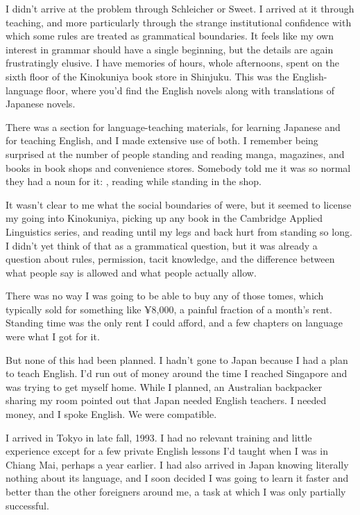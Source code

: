 I didn't arrive at the problem through Schleicher or Sweet. I arrived
at it through teaching, and more particularly through the strange
institutional confidence with which some rules are treated as grammatical
boundaries. It feels like my own interest in grammar should have a single
beginning, but the details are again frustratingly elusive. I have
memories of hours, whole afternoons, spent on the sixth floor of the
Kinokuniya book store in Shinjuku. This was the English-language floor,
where you'd find the English novels along with translations of Japanese
novels.

There was a section for language-teaching materials, for learning
Japanese and for teaching English, and I made extensive use of both. I
remember being surprised at the number of people standing and reading
manga, magazines, and books in book shops and convenience stores.
Somebody told me it was so normal they had a noun for it:
, reading while standing in the shop.

It wasn't clear to me what the social boundaries of 
were, but it seemed to license my going into Kinokuniya, picking up any
book in the Cambridge Applied Linguistics series, and reading until my
legs and back hurt from standing so long. I didn't yet think of that as
a grammatical question, but it was already a question about rules,
permission, tacit knowledge, and the difference between what people say
is allowed and what people actually allow.

There was no way I was going to be able to buy any of those tomes, which
typically sold for something like ¥8,000, a painful fraction of a
month's rent. Standing time was the only rent I could afford, and a few
chapters on language were what I got for it.

But none of this had been planned. I hadn't gone to Japan because I had a plan to teach English. I'd run out of money around the time I reached Singapore and was trying to get myself home. While I planned, an Australian backpacker sharing my room pointed out that Japan needed English teachers. I needed money, and I spoke English. We were compatible.

I arrived in Tokyo in late fall, 1993. I had no relevant training and little experience except for a few private English lessons I'd taught when I was in Chiang Mai, perhaps a year earlier. I had also arrived in Japan knowing literally nothing about its language, and I soon decided I was going to learn it faster and better than the other foreigners around me, a task at which I was only partially successful.

